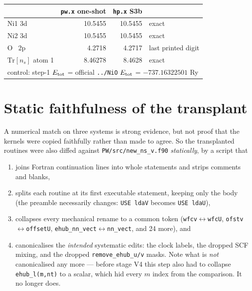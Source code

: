 \documentclass[11pt,a4paper]{article}
\newcommand{\C}[1]{\texttt{\small #1}}
\begin{document}
\begin{center}\small
\begin{tabular}{lrrl}
\toprule
& \C{pw.x} one-shot & \C{hp.x} S3b & \\
\midrule
Ni1 3d & 10.5455 & 10.5455 & exact \\
Ni2 3d & 10.5455 & 10.5455 & exact \\
O \ 2p &  4.2718 &  4.2717 & last printed digit \\
$\mathrm{Tr}[n_s]$ atom 1 & 8.46278 & 8.4628 & exact \\
\midrule
\multicolumn{4}{l}{\footnotesize control: step-1 $E_{\rm tot}$ = official \C{../NiO} $E_{\rm tot}$ = $-737.16322501$ Ry}\\
\bottomrule
\end{tabular}
\end{center}

\section{Static faithfulness of the transplant}

A numerical match on three systems is strong evidence, but not proof that the
kernels were copied faithfully rather than made to agree. So the transplanted
routines were also diffed against \C{PW/src/new_ns_v.f90} \emph{statically}, by
a script that

\begin{enumerate}[leftmargin=1.4em,itemsep=1pt]
\item joins Fortran continuation lines into whole statements and strips
      comments and blanks,
\item splits each routine at its first executable statement, keeping only the
      body (the preamble necessarily changes: \C{USE ldaV} becomes
      \C{USE ldaU}),
\item collapses every mechanical rename to a common token
      (\C{wfcv}$\leftrightarrow$\C{wfcU}, \C{ofstv}$\leftrightarrow$\C{offsetU},
      \C{ehub_nn_vect}$\leftrightarrow$\C{nn_vect}, and 24 more), and
\item canonicalises the \emph{intended} systematic edits: the clock labels,
      the dropped SCF mixing, and the dropped \C{remove_ehub_u/v} masks.
      Note what is \emph{not} canonicalised any more --- before stage V4 this
      step also had to collapse \C{ehub_l(m,nt)} to a scalar, which hid every
      $m$ index from the comparison. It no longer does.
\end{enumerate}
\end{document}
